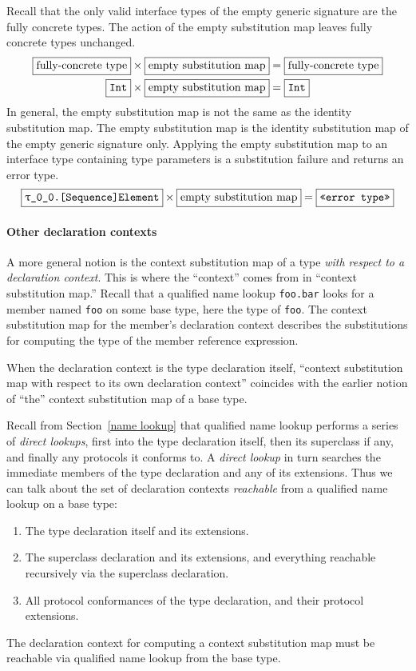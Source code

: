 \documentclass[a4paper,headsepline,bibliography=totoc,toc=flat,fleqn,twoside=semi]{scrbook}
\theoremstyle{definition}
\theoremstyle{definition}
\theoremstyle{definition}
\newcommand{\mathboxed}[1]{\boxed{\mbox{\vphantom{pI\texttt{pI}}#1}}}
\newcommand{\ttbox}[1]{\boxed{\mbox{\vphantom{pI\texttt{pI}}\texttt{#1}}}}
\newcommand{\ttgp}[2]{\texttt{$\uptau$\_#1\_#2}}
\begin{document}
Recall that the only valid interface types of the empty generic signature are the fully concrete types. The action of the empty substitution map leaves fully concrete types unchanged.
\begin{gather*}
\mathboxed{fully-concrete type} \times \mathboxed{empty substitution map} = \mathboxed{fully-concrete type}\\
\ttbox{Int}\times\mathboxed{empty substitution map}=\ttbox{Int}
\end{gather*}
In general, the empty substitution map is not the same as the identity substitution map. The empty substitution map is the identity substitution map of the empty generic signature only. Applying the empty substitution map to an interface type containing type parameters is a substitution failure and returns an error type.
\[\ttbox{\ttgp{0}{0}.[Sequence]Element} \times \mathboxed{empty substitution map} = \ttbox{<<error type>>}\]

\paragraph{Other declaration contexts} A more general notion is the context substitution map of a type \emph{with respect to a declaration context}. This is where the ``context'' comes from in ``context substitution map.'' Recall that a qualified name lookup \texttt{foo.bar} looks for a member named \texttt{foo} on some base type, here the type of \texttt{foo}. The context substitution map for the member's declaration context describes the substitutions for computing the type of the member reference expression.

When the declaration context is the type declaration itself, ``context substitution map with respect to its own declaration context'' coincides with the earlier notion of ``the'' context substitution map of a base type.

Recall from Section~\ref{name lookup} that qualified name lookup performs a series of \emph{direct lookups}, first into the type declaration itself, then its superclass if any, and finally any protocols it conforms to. A \emph{direct lookup} in turn searches the immediate members of the type declaration and any of its extensions. Thus we can talk about the set of declaration contexts \emph{reachable} from a qualified name lookup on a base type:
\begin{enumerate}
\item The type declaration itself and its extensions.
\item The superclass declaration and its extensions, and everything reachable recursively via the superclass declaration.
\item All protocol conformances of the type declaration, and their protocol extensions.
\end{enumerate}
The declaration context for computing a context substitution map must be reachable via qualified name lookup from the base type.
\end{document}

